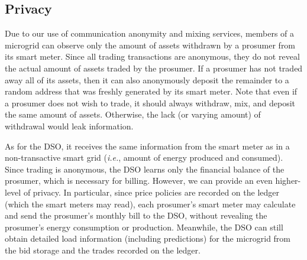 
\subsection{Privacy}
Due to our use of communication anonymity and mixing services, members
of a microgrid can observe only the amount of assets withdrawn by a
prosumer from its smart meter.
Since all trading transactions are anonymous, they do not reveal the
actual amount of assets traded by the prosumer.  If a prosumer has not traded away all of its assets, 
then it can also anonymously deposit the remainder to
a random address that was freshly generated by its smart meter. Note that even
if a prosumer does not wish to trade, it should always
withdraw, mix, and deposit the same amount of assets.  Otherwise, the
lack (or varying amount) of withdrawal would leak information.

As for the DSO, it receives the same information from the smart meter
as in a non-transactive smart grid (\emph{i.e.}, amount of energy
produced and consumed).  Since trading is anonymous, the DSO learns
only the financial balance of the prosumer, which is necessary for
billing.  However, we can provide an even higher-level of privacy.  In
particular, since price policies are recorded on the ledger (which the
smart meters may read), each prosumer's smart meter may calculate and
send the prosumer's monthly bill to the DSO, without revealing the
prosumer's energy consumption or production.  Meanwhile, the DSO can
still obtain detailed load information (including predictions) for the
microgrid from the bid storage and the trades recorded on the ledger.

